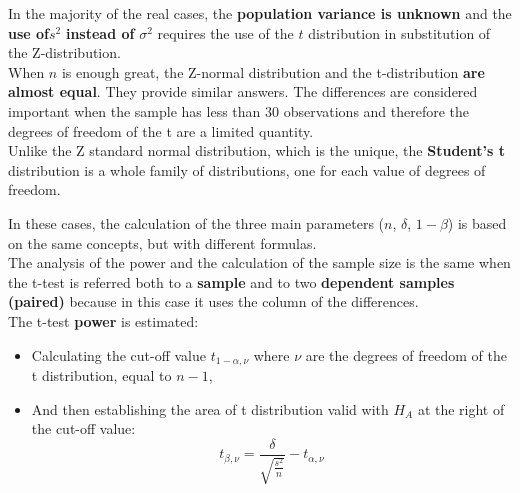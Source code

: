 
\begin{frame}
  \vspace*{.25cm}
  In the majority of the real cases, the \textbf{population variance is unknown} and the \textbf{use of}{\boldmath$s^2$} \textbf{instead of} {\boldmath$\sigma^2$} requires the use of the {\boldmath$t$} distribution in substitution of the Z-distribution.\\
  \vspace*{.5cm}
  When $ n $ is enough great, the Z-normal distribution and the t-distribution \textbf{are almost equal}. They provide similar answers. The differences are considered important when the sample has less than 30 observations and therefore the degrees of freedom of the t are a limited quantity.\\
  \vspace*{.5cm}
  Unlike the Z standard normal distribution, which is the unique, the \textbf{Student's t} distribution is a whole family of distributions, one for each value of degrees of freedom.
\end{frame}

\begin{frame}
  In these cases, the calculation of the three main parameters  ({\boldmath $ n $}, {\boldmath $ \delta $}, {\boldmath $ 1-\beta $}) is based on the same concepts, but with different formulas.\\
  \vspace*{.25cm}
  The analysis of the power and the calculation of the sample size is the same when the t-test is referred both to a \textbf{sample} and to two \textbf{dependent samples (paired)} because in this case it uses the column of the differences.\\
  \vspace*{.25cm}
  The t-test \textbf{power} is estimated:
  \begin{itemize}
    \item Calculating the cut-off value $ t_{1-\alpha,\nu} $ where $ \nu $ are the degrees of freedom of the t distribution, equal to {\boldmath $ n-1 $},
    \item And then establishing the area of t distribution valid with $ H_A $ at the right of the cut-off value:
    $$ t_{\beta,\nu} = \frac{\delta}{\sqrt{\frac{s^2}{n}}}-t_{\alpha,\nu} $$
\end{itemize}
\end{frame}

